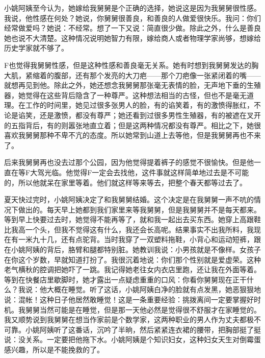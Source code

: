 小姚阿姨至今认为，她嫁给我舅舅是个正确的选择，她说这是因为我舅舅很性感。我说，他性感在何处？她说，你舅舅很善良，和善良的人做爱很快乐。我问：你们经常做爱吗？她说：不经常。想了一下又说：简直很少做。除此之外，什么是善良她也说不大清楚。这种情况说明她智力有限，嫁给商人或者物理学家尚够，想嫁给历史学家就不够了。 

F也觉得我舅舅性感，但是这种性感和善良毫无关系。她有时想到我舅舅发达的胸大肌，紧缩着的腹部，还有那个发亮的大刀疤——那个刀疤像一张紧闭着的嘴——就想再见到他。除此之外，她还想念我舅舅那张毫无表情的脸，无声地下垂的生殖器，她觉得在这些背后隐含了一种尊严。这种想法相当的古怪，但也不是毫无道理。在工作的时间里，她见过很多张男人的脸，有的谄笑着，有的激愤得胀红，不论是谄笑，还是激愤，都没有尊严；她还看到过很多男性生殖器，有的被遮在叉开的五指背后，有的则嚣张地直立着；但是这两种情况都没有尊严。相比之下，她很喜欢我舅舅那种不卑不亢的态度。所以她常到山道上去等他，但是我舅舅再也不来了。 

后来我舅舅再也没去过那个公园，因为他觉得提着裤子的感觉不很愉快。但是他一直在等F大驾光临。他觉得F一定会去找他，这件事就这样简单地过去是不可能的，所以他就呆在家里等着。他们就这样等来等去，把整个春天都等过去了。 

夏天快过完时，小姚阿姨决定了和我舅舅结婚。这个决定是在我舅舅一声不吭的情况下做出的。每天早上她都到我们家里来等我舅舅，但是我舅舅并不是每天都来。等到早上快要过去时，她觉得不能再等了，就和我一起出去买东西。她穿上高跟鞋比我高一个头，但我不觉得这有什么，我还会长高呢。结果事实不出我所料，我现在有一米九十几，还有点驼背。当时我穿了一双塑料拖鞋，小背心和运动短裤，跟在小姚阿姨的背后，胳臂和腿都特别脏。她教训我说：小男孩就是不像样。女孩子在你这个岁数，早就知道打扮了。我很沉着地说：你们那个性别就是爱虚荣。这种老气横秋的腔调把她吓了一跳。我记得她老往女内衣店里跑，还让我在外面等着。等到在快餐店里歇脚时，她才露出一点疑虑重重的口风：你看你舅舅现在正干什么？我说：他大概在睡觉。听了这话，小姚阿姨白净的脸就有点发黑，她恶狠狠地说：混帐！这种日子他居然敢睡觉！这是一条重要经验：挑拨离间一定要掌握好时机。我舅舅当然可能是在睡觉，但是那一天他必然是觉得很不舒服才在家睡觉的。我又顺势说到我舅舅在想当作家前是个数学家，这两种职业的男人作为丈夫都极不可靠。小姚阿姨听了这番话，沉吟了半晌，然后紧紧连衣裙的腰带，把胸部挺了挺说：没关系。一定要把他拖下水。小姚阿姨是个知识妇女，这种妇女天生对倒霉蛋感兴趣，所以是不能挽救的了。 

